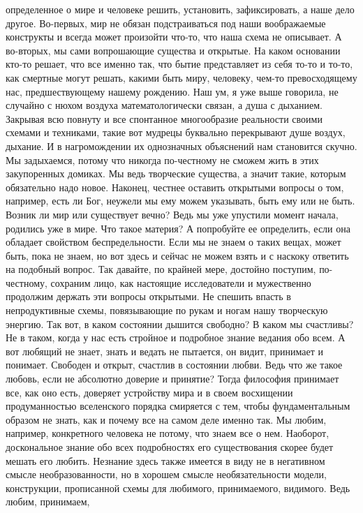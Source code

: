 определенное о мире и человеке решить, установить, зафиксировать, а наше дело
другое. Во-первых, мир не обязан подстраиваться под наши воображаемые конструкты
и всегда может произойти что-то, что наша схема не описывает. А во-вторых, мы
сами вопрошающие существа и открытые. На каком основании кто-то решает, что все
именно так, что бытие представляет из себя то-то и то-то, как смертные могут
решать, какими быть миру, человеку, чем-то превосходящему нас, предшествующему
нашему рождению. Наш ум, я уже выше говорила, не случайно с нюхом воздуха
математологически связан, а душа с дыханием. Закрывая всю повнуту и все
спонтанное многообразие реальности своими схемами и техниками, такие вот мудрецы
буквально перекрывают душе воздух, дыхание. И в нагромождении их однозначных
объяснений нам становится скучно. Мы задыхаемся, потому что никогда по-честному
не сможем жить в этих закупоренных домиках. Мы ведь творческие существа, а
значит такие, которым обязательно надо новое. Наконец, честнее оставить
открытыми вопросы о том, например, есть ли Бог, неужели мы ему можем указывать,
быть ему или не быть. Возник ли мир или существует вечно? Ведь мы уже упустили
момент начала, родились уже в мире. Что такое материя? А попробуйте ее
определить, если она обладает свойством беспредельности. Если мы не знаем о
таких вещах, может быть, пока не знаем, но вот здесь и сейчас не можем взять и с
наскоку ответить на подобный вопрос. Так давайте, по крайней мере, достойно
поступим, по-честному, сохраним лицо, как настоящие исследователи и мужественно
продолжим держать эти вопросы открытыми. Не спешить впасть в непродуктивные
схемы, повязывающие по рукам и ногам нашу творческую энергию. Так вот, в каком
состоянии дышится свободно? В каком мы счастливы? Не в таком, когда у нас есть
стройное и подробное знание ведания обо всем. А вот любящий не знает, знать и
ведать не пытается, он видит, принимает и понимает. Свободен и открыт, счастлив
в состоянии любви. Ведь что же такое любовь, если не абсолютно доверие и
принятие? Тогда философия принимает все, как оно есть, доверяет устройству мира
и в своем восхищении продуманностью вселенского порядка смиряется с тем, чтобы
фундаментальным образом не знать, как и почему все на самом деле именно так. Мы
любим, например, конкретного человека не потому, что знаем все о нем. Наоборот,
доскональное знание обо всех подробностях его существования скорее будет мешать
его любить. Незнание здесь также имеется в виду не в негативном смысле
необразованности, но в хорошем смысле необязательности модели, конструкции,
прописанной схемы для любимого, принимаемого, видимого. Ведь любим, принимаем,
